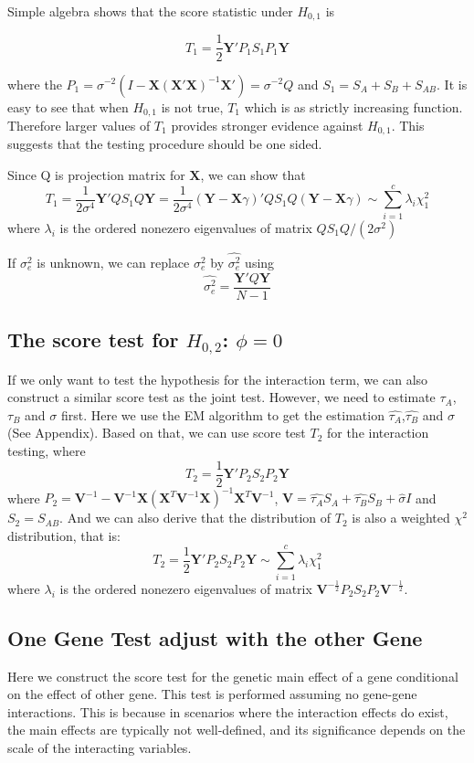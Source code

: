 \documentclass{article}
\newcommand{\Y}{\mathbf{Y}}
\newcommand{\X}{\mathbf{X}}
\newcommand{\V}{\mathbf{V}}
\newcommand{\VV}{\mathbf{V}^{-1}}
\begin{document}
        Simple algebra shows that the score statistic under $H_{0,1}$ is

        \[
            T_1=\frac{1}{2}\Y'P_1S_1P_1\Y
        \]

        where the $P_1=\sigma^{-2}(I-\X(\X'\X)^{-1}\X')=\sigma^{-2}Q$ and $S_1=S_A+S_B+S_{AB}$. It is easy to see that when $H_{0,1}$ is not true, $T_1$ which is as strictly increasing function. Therefore larger values of $T_1$ provides stronger evidence against $H_{0,1}$. This suggests that the testing procedure should be one sided.

        Since Q is projection matrix for $\X$, we can show that
        \[
            T_1=\frac{1}{2\sigma^4}\Y'QS_1Q\Y=\frac{1}{2\sigma^4}(\Y-\X\gamma)'QS_1Q(\Y-\X\gamma)\sim\sum_{i=1}^c\lambda_i\chi^2_1
        \]
        where $\lambda_i$ is the ordered nonezero eigenvalues of matrix $QS_1Q/(2\sigma^2)$

        If $\sigma^2_e$ is unknown, we can replace $\sigma^2_e$ by $\hat{\sigma^2_e}$ using
        \[
            \hat{\sigma^2_e}=\frac{\Y'Q\Y}{N-1}
        \]

        \subsection{The score test for $H_{0,2}$: $\phi=0$}
        If we only want to test the hypothesis for the interaction term, we can also construct a similar score test as the joint test. However, we need to estimate $\tau_A$, $\tau_B$ and $\sigma$ first. Here we use the EM algorithm to get the estimation $\hat{\tau_A}$,$\hat{\tau_B}$ and $\hat{\sigma}$(See Appendix). Based on that, we can use score test $T_2$ for the interaction testing, where
        \[
            T_2=\frac{1}{2}\Y'P_2S_2P_2\Y
        \]
        where $P_2=\VV-\VV\X(\X^T\VV\X)^{-1}\X^T\VV$, $\V=\hat{\tau_A}S_A+\hat{\tau_B}S_B+\hat{\sigma}I$ and $S_2=S_{AB}$. And we can also derive that the distribution of $T_2$ is also a weighted $\chi^2$ distribution, that is:
        \[
            T_2=\frac{1}{2}\Y'P_2S_2P_2\Y\sim\sum_{i=1}^c\lambda_i\chi^2_1
        \]
        where $\lambda_i$ is the  ordered nonezero eigenvalues of matrix $\V^{-\frac{1}{2}}P_2S_2P_2\V^{-\frac{1}{2}}$.

        \subsection{One Gene Test adjust with the other Gene}

        Here we construct the score test for the genetic main effect of a gene conditional on the effect of other gene. This test is performed assuming no gene-gene interactions. This is because in scenarios where the interaction effects do exist, the main effects are typically not well-defined, and its significance depends on the scale of the interacting variables.
\end{document}
